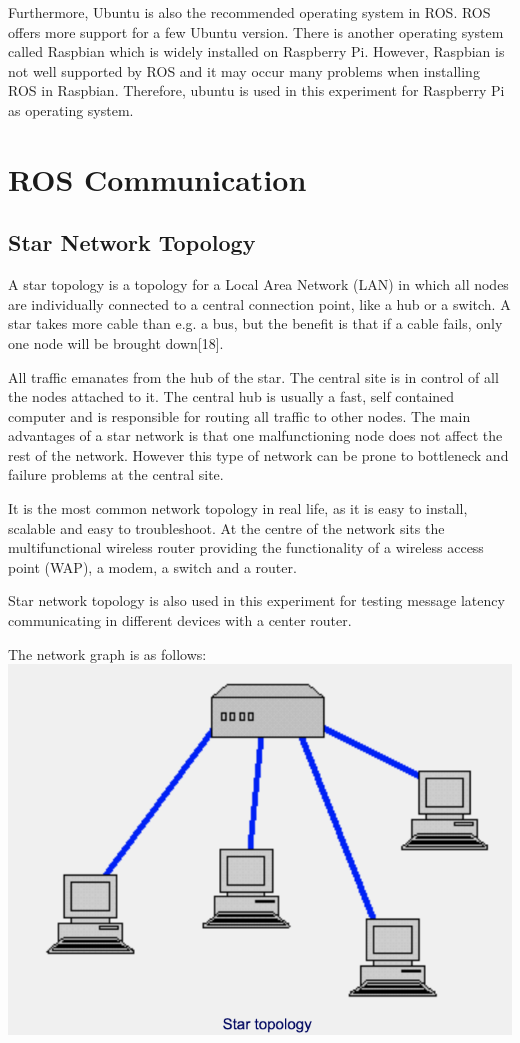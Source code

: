\documentclass{mproj}
\begin{document}
Furthermore, Ubuntu is also the recommended operating system in ROS. ROS offers more support for a few Ubuntu version. There is another operating system called Raspbian which is widely installed on Raspberry Pi. However, Raspbian is not well supported by ROS and it may occur many problems when installing ROS in Raspbian. Therefore, ubuntu is used in this experiment for Raspberry Pi as operating system.

\section{ROS Communication}

\subsection{Star Network Topology}
A star topology is a topology for a Local Area Network (LAN) in which all nodes are individually connected to a central connection point, like a hub or a switch. A star takes more cable than e.g. a bus, but the benefit is that if a cable fails, only one node will be brought down[18].

All traffic emanates from the hub of the star. The central site is in control of all the nodes attached to it. The central hub is usually a fast, self contained computer and is responsible for routing all traffic to other nodes. The main advantages of a star network is that one malfunctioning node does not affect the rest of the network. However this type of network can be prone to bottleneck and failure problems at the central site.

It is the most common network topology in real life, as it is easy to install, scalable and easy to troubleshoot. At the centre of the network sits the multifunctional wireless router providing the functionality of a wireless access point (WAP), a modem, a switch and a router.

Star network topology is also used in this experiment for testing message latency communicating in different devices with a center router.

The network graph is as follows:
\includegraphics[width = .7\textwidth]{231.png}
\end{document}
